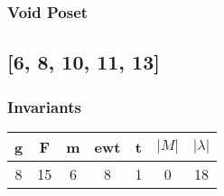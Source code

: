 \documentclass[a4paper]{article}
\begin{document}
\hfill\begin{minipage}{0.48\textwidth}
\subsubsection*{Void Poset}
\centering
{}
\end{minipage}
\newpage\subsection{[6, 8, 10, 11, 13]}
\noindent\begin{minipage}{0.6\textwidth}
\subsubsection*{Invariants}
\centering
\begin{tabular}{|c|c|c|c|c|c|c|}
\toprule
g & F & m & ewt & t & \(|M|\) & \(|\lambda|\) \\
\midrule
8 & 15 & 6 & 8 & 1 & 0 & 18 \\
\bottomrule
\end{tabular}
\end{minipage}%
\end{document}
